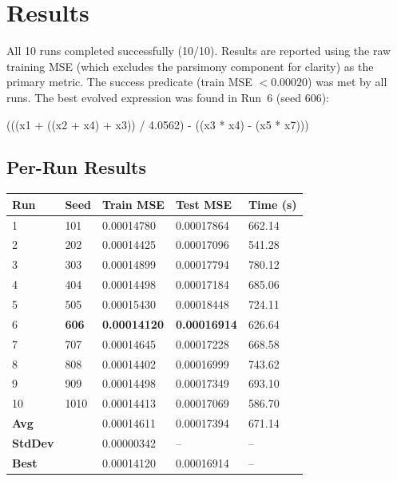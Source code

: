 \documentclass[12pt,a4paper]{article}
\begin{document}
\section{Results}

All 10 runs completed successfully (10/10). Results are reported using the raw
training MSE (which excludes the parsimony component for clarity) as the primary
metric. The success predicate (train MSE $< 0.00020$) was met by all runs.
The best evolved expression was found in Run~6 (seed 606):

\begin{center}
\ttfamily\small
(((x1 + ((x2 + x4) + x3)) / 4.0562) - ((x3 * x4) - (x5 * x7)))
\end{center}

\subsection{Per-Run Results}

\begin{center}
\begin{tabular}{@{}C{1cm}C{1.5cm}C{3cm}C{3cm}C{2cm}@{}}
\toprule
\textbf{Run} & \textbf{Seed} & \textbf{Train MSE} & \textbf{Test MSE} & \textbf{Time (s)} \\
  & 101  & 0.00014780 & 0.00017864 & 662.14 \\
2  & 202  & 0.00014425 & 0.00017096 & 541.28 \\
3  & 303  & 0.00014899 & 0.00017794 & 780.12 \\
4  & 404  & 0.00014498 & 0.00017184 & 685.06 \\
5  & 505  & 0.00015430 & 0.00018448 & 724.11 \\
6  & \textbf{606}  & \textbf{0.00014120} & \textbf{0.00016914} & 626.64 \\
7  & 707  & 0.00014645 & 0.00017228 & 668.58 \\
8  & 808  & 0.00014402 & 0.00016999 & 743.62 \\
9  & 909  & 0.00014498 & 0.00017349 & 693.10 \\
10 & 1010 & 0.00014413 & 0.00017069 & 586.70 \\
\midrule
\textbf{Avg}    & & 0.00014611 & 0.00017394 & 671.14 \\
\textbf{StdDev} & & 0.00000342 & --         & --     \\
\textbf{Best}   & & 0.00014120 & 0.00016914 & --     \\
\bottomrule
\end{tabular}
\end{center}
\end{document}
